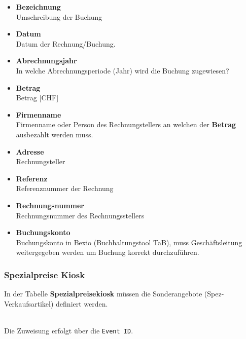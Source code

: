 \documentclass[
]{article}
\begin{document}
\begin{itemize}
\begin{itemize}
    \textbf{``Event ID''} des Films dazugehörigen Films eingetragen
    werden, damit die Ausgaben auf der Filmabrechnung ausgewiesen
    werden. Bei Ausgaben die sich nicht auf ein spezifische
    \textbf{``Event ID''} beziehen, muss dieses Feld leer gelassen
    werden. Diese Ausgaben werden nur in der Jahresabrechnung
    berücksichtigt.\\
  \item
    \textbf{Bezeichnung}\\
    Umschreibung der Buchung
  \item
    \textbf{Datum}\\
    Datum der Rechnung/Buchung.
  \item
    \textbf{Abrechnungsjahr}\\
    In welche Abrechnungsperiode (Jahr) wird die Buchung zugewiesen?
  \item
    \textbf{Betrag}\\
    Betrag {[}CHF{]}
  \item
    \textbf{Firmenname}\\
    Firmenname oder Person des Rechnungstellers an welchen der
    \textbf{Betrag} ausbezahlt werden muss.
  \item
    \textbf{Adresse}\\
    Rechnungsteller
  \item
    \textbf{Referenz}\\
    Referenznummer der Rechnung
  \item
    \textbf{Rechnungsnummer}\\
    Rechnungsnummer des Rechnungsstellers
  \item
    \textbf{Buchungskonto}\\
    Buchungskonto in Bexio (Buchhaltungstool TaB), muss Geschäftsleitung
    weitergegeben werden um Buchung korrekt durchzuführen.
  \end{itemize}
\end{itemize}

\subsubsection{Spezialpreise Kiosk}\label{spezialpreise-kiosk}

In der Tabelle \textbf{Spezialpreisekiosk} müssen die Sonderangebote
(Spez-Verkaufsartikel) definiert werden.\\
\strut \\
Die Zuweisung erfolgt über die \texttt{Event\ ID}.
\end{document}

